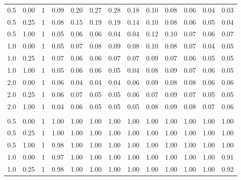 \begin{table}
\begin{threeparttable}
\begin{tabular}[t]{rrrrrrrrrrrrr}
\hspace{1em}0.5 & 0.00 & 1 & 0.09 & 0.20 & 0.27 & 0.28 & 0.18 & 0.10 & 0.08 & 0.06 & 0.04 & 0.03\\
\hspace{1em}0.5 & 0.25 & 1 & 0.08 & 0.15 & 0.19 & 0.19 & 0.14 & 0.10 & 0.08 & 0.06 & 0.05 & 0.04\\
\hspace{1em}0.5 & 1.00 & 1 & 0.05 & 0.06 & 0.06 & 0.04 & 0.04 & 0.12 & 0.10 & 0.07 & 0.06 & 0.07\\
\hspace{1em}1.0 & 0.00 & 1 & 0.05 & 0.07 & 0.08 & 0.09 & 0.08 & 0.10 & 0.08 & 0.07 & 0.04 & 0.05\\
\hspace{1em}1.0 & 0.25 & 1 & 0.07 & 0.06 & 0.06 & 0.07 & 0.07 & 0.09 & 0.07 & 0.06 & 0.05 & 0.05\\
\hspace{1em}1.0 & 1.00 & 1 & 0.05 & 0.06 & 0.06 & 0.05 & 0.04 & 0.08 & 0.09 & 0.07 & 0.06 & 0.05\\
\hspace{1em}2.0 & 0.00 & 1 & 0.06 & 0.04 & 0.04 & 0.04 & 0.06 & 0.09 & 0.08 & 0.08 & 0.06 & 0.06\\
\hspace{1em}2.0 & 0.25 & 1 & 0.06 & 0.07 & 0.05 & 0.05 & 0.06 & 0.07 & 0.09 & 0.07 & 0.05 & 0.05\\
\hspace{1em}2.0 & 1.00 & 1 & 0.04 & 0.06 & 0.05 & 0.05 & 0.05 & 0.08 & 0.09 & 0.08 & 0.07 & 0.06\\
\addlinespace[0.3em]
\multicolumn{13}{c}{\textbf{2 Discrete Practices - Power}}\\
\hspace{1em}0.5 & 0.00 & 1 & 1.00 & 1.00 & 1.00 & 1.00 & 1.00 & 1.00 & 1.00 & 1.00 & 1.00 & 1.00\\
\hspace{1em}0.5 & 0.25 & 1 & 1.00 & 1.00 & 1.00 & 1.00 & 1.00 & 1.00 & 1.00 & 1.00 & 1.00 & 1.00\\
\hspace{1em}0.5 & 1.00 & 1 & 0.98 & 1.00 & 1.00 & 1.00 & 1.00 & 1.00 & 1.00 & 1.00 & 1.00 & 1.00\\
\hspace{1em}1.0 & 0.00 & 1 & 0.97 & 1.00 & 1.00 & 1.00 & 1.00 & 1.00 & 1.00 & 1.00 & 1.00 & 0.91\\
\hspace{1em}1.0 & 0.25 & 1 & 0.98 & 1.00 & 1.00 & 1.00 & 1.00 & 1.00 & 1.00 & 1.00 & 1.00 & 0.92\\

\end{tabular}
\end{threeparttable}
\end{table}
